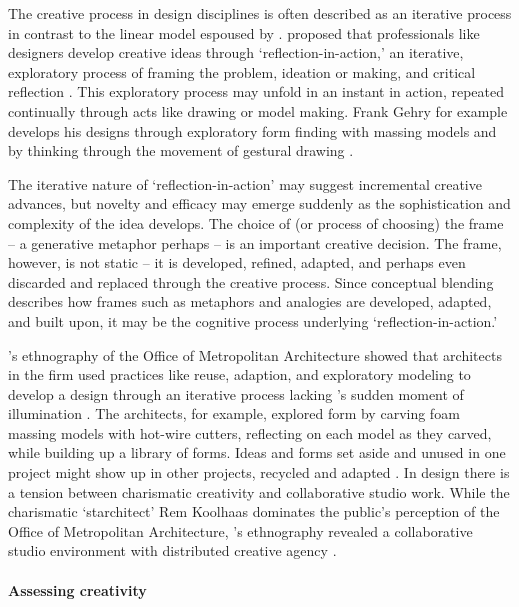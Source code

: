 \documentclass{article}
\begin{document}
The creative process in design disciplines is often described as an iterative process 
in contrast to the linear model espoused by \citeauthor{Wallas1926}. 
%
\citeauthor{Schon1983} proposed that 
professionals like designers develop creative ideas through `reflection-in-action,' 
an iterative, exploratory process 
of framing the problem, ideation or making, and critical reflection \citeyearpar{Schon1983}.
This exploratory process may unfold in an instant in action, 
repeated continually through acts like drawing or model making. 
%
Frank Gehry for example develops his designs through exploratory form finding with massing models
and by thinking through the movement of gestural drawing
\cite{Gehry2004,Pollack2006}.
%

%
The iterative nature of `reflection-in-action' 
may suggest incremental creative advances, but 
novelty and efficacy may emerge suddenly
as the sophistication and complexity of the idea develops. 
The choice of (or process of choosing) the frame -- a generative metaphor perhaps -- is an important creative decision.
%
The frame, however, is not static -- it is developed, refined, adapted, and perhaps even discarded and replaced through the creative process.
Since conceptual blending describes how frames such as metaphors and analogies 
are developed, adapted, and built upon, 
it may be the cognitive process underlying `reflection-in-action.' 
%

\citeauthor{Yaneva2009}'s ethnography of the Office of Metropolitan Architecture
showed that architects in the firm used practices like reuse, adaption, and exploratory modeling
to develop a design through an iterative process lacking \citeauthor{Wallas1926}'s sudden moment of illumination \citeyearpar{Yaneva2009}. 
The architects, for example, explored form by carving foam massing models with hot-wire cutters, reflecting on each model as they carved, while building up a library of forms. Ideas and forms set aside and unused in one project might show up in other projects, recycled and adapted \citep{Yaneva2009}.
%
In design there is a tension between charismatic creativity and collaborative studio work. 
%
While the charismatic `starchitect' Rem Koolhaas dominates the public's perception of the Office of Metropolitan Architecture, 
\citeauthor{Yaneva2009}'s ethnography revealed a collaborative studio environment with distributed creative agency \citeyearpar{Yaneva2009}. 

\paragraph{Assessing creativity}
\end{document}

